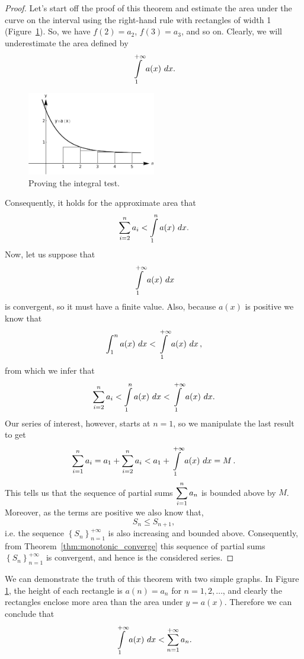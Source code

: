 \begin{proof}
Let's start off the proof of this theorem and estimate the area under the curve on the interval  using the right-hand rule with rectangles of width 1 (Figure~\ref{fig_series_10a}). So, we have $f(2)=a_2$, $f(3)=a_3$, and so on. Clearly,  we will underestimate the area defined by $$\displaystyle\int\limits_1^{+\infty} a(x)\ dx.$$

\begin{figure}
	\begin{center}
			\includegraphics[width=0.5\textwidth]{fig_series_10b}
	\caption{Proving the integral test.}
	\label{fig_series_10a}
	\end{center}
\end{figure}

Consequently, it holds for the approximate area that
$$\ds \sum_{i=2}^n a_i<\ds\int\limits_1^n a(x)\ dx.$$
Now, let us suppose that
$$
\displaystyle\int\limits_1^{+\infty} a(x)\ dx
$$
is convergent, so it must have a finite value. Also, because $a(x)$ is positive we know that
$$
\ds\int_1^n a(x)\ dx<\ds\int\limits_1^{+\infty} a(x)\ dx\,,
$$
from which we infer that
$$
\ds \sum_{i=2}^n a_i<\ds\int\limits_1^n a(x)\ dx<\ds\int\limits_1^{+\infty} a(x)\ dx.
$$
Our series of interest, however, starts at $n=1$, so we manipulate the last result to get
$$
\displaystyle \sum_{i=1}^n a_i=a_1+\displaystyle \sum_{i=2}^n a_i<a_1+\displaystyle\int\limits_1^{+\infty} a(x)\ dx=M\,.
$$
This tells us that the sequence of partial sums $\displaystyle \sum_{i=1}^n a_n$ is bounded above by $M$. Moreover, as the terms are positive we also know that,
$$
S_n\leq S_{n+1},
$$
i.e. the sequence $\left\{S_n\right\}_{n=1}^{+\infty}$ is also increasing and bounded above. Consequently, from Theorem~\ref{thm:monotonic_converge} this sequence of partial sums $\left\{S_n\right\}_{n=1}^{+\infty}$ is convergent, and hence is the considered series.
\end{proof}


\fi

\ifcalculus
We can demonstrate the truth of this theorem with two simple graphs. In Figure \ref{fig_series_10a}, the height of each rectangle is $a(n)=a_n$ for $n=1,2,\ldots$, and clearly the rectangles enclose more area than the area under $y=a(x)$. Therefore we can conclude that \
\begin{equation}
\displaystyle\int\limits_1^{+\infty} a(x)\ dx < \sum_{n=1}^{+\infty} a_n.
\label{eq:integral_testa}
\end{equation}


